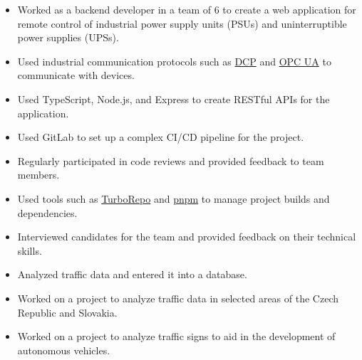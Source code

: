 \documentclass[10pt,a4paper,ragged2e,withhyper]{altacv}
\begin{document}


\makecvheader
\bigskip
{}

\begin{paracol}{2}

	\begin{itemize}
		\item Worked as a backend developer in a team of 6 to create a web application for remote control of industrial power supply units (PSUs) and uninterruptible power supplies (UPSs).
		\item Used industrial communication protocols such as \href{https://profinetuniversity.com/naming-addressing/profinet-dcp/}{DCP} and \href{https://opcfoundation.org/about/opc-technologies/opc-ua/}{OPC UA} to communicate with devices.
		\item Used TypeScript, Node.js, and Express to create RESTful APIs for the application.
		\item Used GitLab to set up a complex CI/CD pipeline for the project.
		\item Regularly participated in code reviews and provided feedback to team members.
		\item Used tools such as \href{https://turborepo.com/}{TurboRepo} and \href{https://pnpm.io/}{pnpm} to manage project builds and dependencies.
		\item Interviewed candidates for the team and provided feedback on their technical skills.
	\end{itemize}

	\divider

	\begin{itemize}
		\item Analyzed traffic data and entered it into a database.
		\item Worked on a project to analyze traffic data in selected areas of the Czech Republic and Slovakia.
		\item Worked on a project to analyze traffic signs to aid in the development of autonomous vehicles.
	\end{itemize}


\end{paracol}
\end{document}
